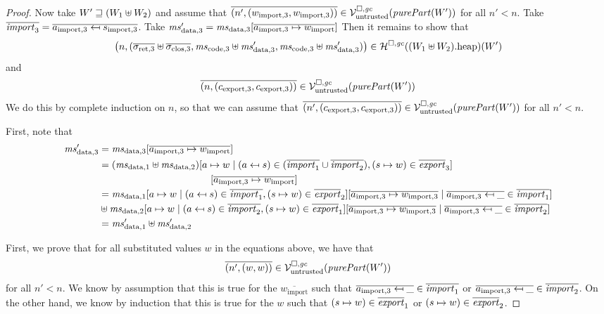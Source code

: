 \documentclass[a4paper]{article}
\begin{document}
\begin{proof}
  Now take $W' \sqsupseteq (W_1\uplus W_2)$ and assume that $\overline{\npair[n']{(w_{\mathrm{import},3},w_{\mathrm{import},3})}} \in \lrv(\purePart{W'})$ for all $n' < n$.
  Take $\overline{\mathit{import}_3} = \overline{a_{\mathrm{import},3} \mapsfrom s_{\mathrm{import},3}}$.
  Take $\msdata[3]' = \msdata[3]{}[\overline{a_{\mathrm{import},3} \mapsto w_{\mathrm{import}}}]$
  Then it remains to show that
  \begin{equation*}
    \npair{(\sigrets[3]\uplus\sigcloss[3],\mscode[3]\uplus \msdata[3]', \mscode[3]\uplus\msdata[3]')} \in \lrheap(\pwheap[(W_1\uplus W_2)])(W')
  \end{equation*}
  and
  \begin{equation*}
    \overline{\npair{(c_{\mathrm{export},3},c_{\mathrm{export},3})}} \in \lrv(\purePart{W'})
  \end{equation*}
  We do this by complete induction on $n$, so that we can assume that $\overline{\npair[n']{(c_{\mathrm{export},3},c_{\mathrm{export},3})}} \in \lrv(\purePart{W'})$ for all $n' < n$.

  First, note that
  \begin{align*}
    \msdata[3]' &= \msdata[3]{}[\overline{a_{\mathrm{import},3} \mapsto w_{\mathrm{import}}}]\\
                &=(\msdata[1] \uplus \msdata[2])[a \mapsto w \mid (a \mapsfrom s) \in (\overline{\var{import}_1} \cup \overline{\var{import}_2}), (s \mapsto w) \in \overline{\var{export}}_3]\\
                  &\hspace{4cm}[\overline{a_{\mathrm{import},3} \mapsto w_{\mathrm{import}}}]\\
                &= \msdata[1][a \mapsto w \mid (a \mapsfrom s) \in \overline{\var{import}_1}, (s \mapsto w) \in \overline{\var{export}}_2][\overline{a_{\mathrm{import},3} \mapsto w_{\mathrm{import},3}} \mid \overline{a_{\mathrm{import},3}\mapsfrom \_} \in \overline{\var{import}_1}]\\
                &\uplus \msdata[2][a \mapsto w \mid (a \mapsfrom s) \in \overline{\var{import}_2}, (s \mapsto w) \in \overline{\var{export}}_1][\overline{a_{\mathrm{import},3} \mapsto w_{\mathrm{import},3}} \mid \overline{a_{\mathrm{import},3}\mapsfrom \_} \in \overline{\var{import}_2}]\\
                &= \msdata[1]' \uplus \msdata[2]'
  \end{align*}
  
  First, we prove that for all substituted values $w$ in the equations above, we have that
  \begin{equation*}
    \overline{\npair[n']{(w,w)}} \in \lrv(\purePart{W'})
  \end{equation*}
  for all $n' < n$.
  We know by assumption that this is true for the $\overline{w_{\mathrm{import}}}$ such that $\overline{a_{\mathrm{import},3}\mapsfrom \_} \in \overline{\mathit{import}_1}$ or $\overline{a_{\mathrm{import},3}\mapsfrom \_} \in \overline{\mathit{import}_2}$.
  On the other hand, we know by induction that this is true for the $w$ such that $(s \mapsto w) \in \overline{\mathit{export}}_1$ or $(s \mapsto w) \in \overline{\mathit{export}}_2$.
  

\end{proof}
\end{document}
